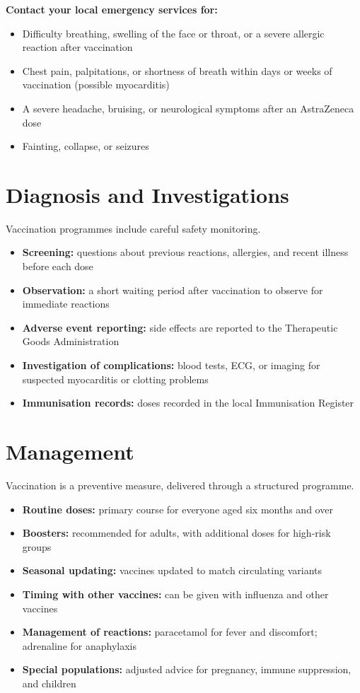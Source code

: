 \textbf{Contact your local emergency services for:}
\begin{itemize}
    \item Difficulty breathing, swelling of the face or throat, or a severe allergic reaction after vaccination
    \item Chest pain, palpitations, or shortness of breath within days or weeks of vaccination (possible myocarditis)
    \item A severe headache, bruising, or neurological symptoms after an AstraZeneca dose
    \item Fainting, collapse, or seizures
\end{itemize}

\section*{Diagnosis and Investigations}
Vaccination programmes include careful safety monitoring.

\begin{itemize}
    \item \textbf{Screening:} questions about previous reactions, allergies, and recent illness before each dose
    \item \textbf{Observation:} a short waiting period after vaccination to observe for immediate reactions
    \item \textbf{Adverse event reporting:} side effects are reported to the Therapeutic Goods Administration
    \item \textbf{Investigation of complications:} blood tests, ECG, or imaging for suspected myocarditis or clotting problems
    \item \textbf{Immunisation records:} doses recorded in the local Immunisation Register
\end{itemize}

\section*{Management}
Vaccination is a preventive measure, delivered through a structured programme.

\begin{itemize}
    \item \textbf{Routine doses:} primary course for everyone aged six months and over
    \item \textbf{Boosters:} recommended for adults, with additional doses for high-risk groups
    \item \textbf{Seasonal updating:} vaccines updated to match circulating variants
    \item \textbf{Timing with other vaccines:} can be given with influenza and other vaccines
    \item \textbf{Management of reactions:} paracetamol for fever and discomfort; adrenaline for anaphylaxis
    \item \textbf{Special populations:} adjusted advice for pregnancy, immune suppression, and children
\end{itemize}

